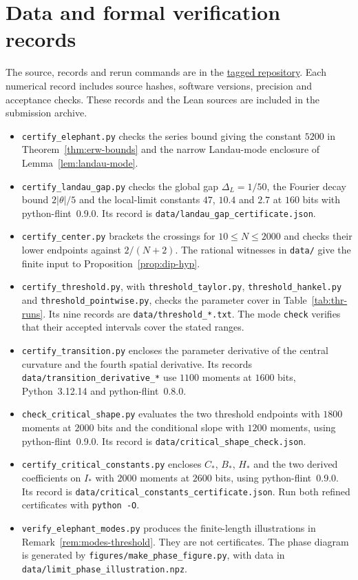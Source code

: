 \section{Data and formal verification records}\label{app:data}

The source, records and rerun commands are in the
\href{https://github.com/apemm/Kagey-Problems/tree/paperD-ejp-v1/kagey-problems/problem131/paperD}{tagged repository}.
Each numerical record includes source hashes, software versions,
precision and acceptance checks. These records and the Lean sources
are included in the submission archive.

\begin{itemize}
\item \nolinkurl{certify_elephant.py} checks the series bound giving
the constant $5200$ in Theorem~\ref{thm:erw-bounds} and the narrow
Landau-mode enclosure of Lemma~\ref{lem:landau-mode}.
\item \nolinkurl{certify_landau_gap.py} checks the global gap
$\Delta_L=1/50$, the Fourier decay bound $2|\theta|/5$ and the
local-limit constants $47$, $10.4$ and $2.7$ at $160$ bits with
python-flint~0.9.0. Its record is
\nolinkurl{data/landau_gap_certificate.json}.
\item \nolinkurl{certify_center.py} brackets the crossings for
$10\le N\le2000$ and checks their lower endpoints against $2/(N+2)$.
The rational witnesses in \nolinkurl{data/} give the finite input to
Proposition~\ref{prop:dip-hyp}.
\item \nolinkurl{certify_threshold.py}, with
\nolinkurl{threshold_taylor.py}, \nolinkurl{threshold_hankel.py} and
\nolinkurl{threshold_pointwise.py}, checks the parameter cover in
Table~\ref{tab:thr-runs}. Its nine records are
\nolinkurl{data/threshold_*.txt}. The mode \texttt{check} verifies that
their accepted intervals cover the stated ranges.
\item \nolinkurl{certify_transition.py} encloses the parameter derivative
of the central curvature and the fourth spatial derivative.
Its records \nolinkurl{data/transition_derivative_*} use $1100$
moments at $1600$ bits, Python~3.12.14 and python-flint~0.8.0.
\item \nolinkurl{check_critical_shape.py} evaluates the two threshold
endpoints with $1800$ moments at $2000$ bits and the conditional slope
with $1200$ moments, using python-flint~0.9.0. Its record is
\nolinkurl{data/critical_shape_check.json}.
\item \nolinkurl{certify_critical_constants.py} encloses $C_*$, $B_*$,
$H_*$ and the two derived coefficients on $I_*$ with $2000$ moments
at $2600$ bits, using python-flint~0.9.0. Its record is
\nolinkurl{data/critical_constants_certificate.json}.
Run both refined certificates with \texttt{python -O}.
\item \nolinkurl{verify_elephant_modes.py} produces the finite-length
illustrations in Remark~\ref{rem:modes-threshold}. They are not
certificates. The phase diagram is generated by
\nolinkurl{figures/make_phase_figure.py}, with data in
\nolinkurl{data/limit_phase_illustration.npz}.
\end{itemize}

